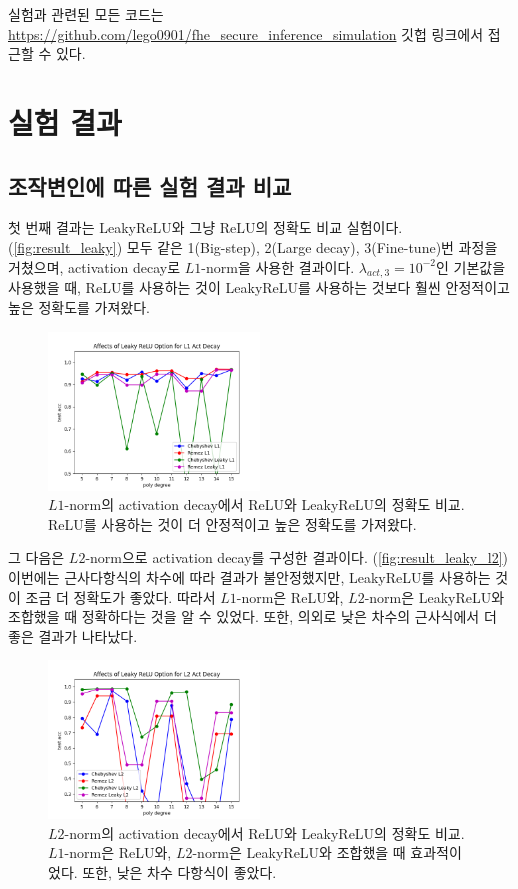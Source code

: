 \documentclass[a4paper, 11pt, chapterprefix=false]{report}
\begin{document}
실험과 관련된 모든 코드는
\url{https://github.com/lego0901/fhe_secure_inference_simulation} 깃헙 링크에서
접근할 수 있다.


\chapter{실험 결과}

\section{조작변인에 따른 실험 결과 비교}

첫 번째 결과는 LeakyReLU와 그냥 ReLU의 정확도 비교 실험이다.
(\autoref{fig:result_leaky}) 모두 같은 1(Big-step), 2(Large decay),
3(Fine-tune)번 과정을 거쳤으며, activation decay로 $L1$-norm을 사용한 결과이다.
$\lambda_{act,3}=10^{-2}$인 기본값을 사용했을 때, ReLU를 사용하는 것이
LeakyReLU를 사용하는 것보다 훨씬 안정적이고 높은 정확도를 가져왔다.
\begin{figure}[htbp]
  \centering
  \includegraphics[width=0.5\textwidth]{resource/leaky.png}
  \caption{$L1$-norm의 activation decay에서 ReLU와 LeakyReLU의 정확도 비교. ReLU를 사용하는 것이 더 안정적이고 높은 정확도를 가져왔다.}
  \label{fig:result_leaky}
\end{figure}

그 다음은 $L2$-norm으로 activation decay를 구성한 결과이다.
(\autoref{fig:result_leaky_l2}) 이번에는 근사다항식의 차수에 따라 결과가
불안정했지만, LeakyReLU를 사용하는 것이 조금 더 정확도가 좋았다. 따라서
$L1$-norm은 ReLU와, $L2$-norm은 LeakyReLU와 조합했을 때 정확하다는 것을 알 수
있었다. 또한, 의외로 낮은 차수의 근사식에서 더 좋은 결과가 나타났다.
\begin{figure}[htbp]
  \centering
  \includegraphics[width=0.5\textwidth]{resource/leaky_l2.png}
  \caption{$L2$-norm의 activation decay에서 ReLU와 LeakyReLU의 정확도 비교. $L1$-norm은 ReLU와, $L2$-norm은 LeakyReLU와 조합했을 때 효과적이었다. 또한, 낮은 차수 다항식이 좋았다.}
  \label{fig:result_leaky_l2}
\end{figure}
\end{document}
